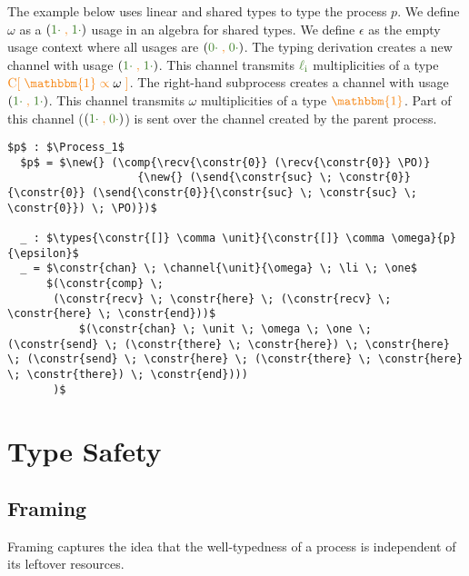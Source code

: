 \documentclass[a4paper,UKenglish,cleveref,autoref,thm-restate,authorcolumns]{lipics-v2019}
\theoremstyle{definition}
\newcommand{\type}[1]{\textcolor{BlueViolet}{\operatorname{#1}}}
\newcommand{\constr}[1]{\textcolor{BurntOrange}{\operatorname{#1}}}
\newcommand{\func}[1]{\textcolor{OliveGreen}{\operatorname{#1}}}
\newcommand{\PO}{\constr{\mathbb{0}}}
\newcommand{\comp}[2]{#1 \; \constr{\parallel} \; #2}
\newcommand{\new}{\constr{\boldsymbol{\nu}} \;}
\newcommand{\send}[2]{#1 \; \constr{\langle} \; #2 \;\constr{\rangle} \;}
\newcommand{\recv}[1]{#1 \; \constr{\mathbb{()}} \;}
\newcommand{\unit}{\constr{\mathbbm{1}}}
\newcommand{\channel}[2]{\constr{C[} \; #1 \; \constr{\propto} \; #2 \; \constr{]}}
\newcommand{\comma}{\; \constr{,} \;}
\newcommand{\zero}{\func{0\cdot}}
\newcommand{\one}{\func{1\cdot}}
\newcommand{\li}{\func{\ell_i}}
\newcommand{\types}[4]{#1 \; \type{\propto} \; #2 \; \type{\vdash} \; #3 \; \type{\boxtimes} \; #4}
\newcommand{\Process}{\type{PROCESS}}
\begin{document}
\begin{example}
  \label{example-derivations}
  The example below uses linear and shared types to type the process $p$. 
  We define $\omega$ as a $(\one \comma \one)$ usage in an algebra for shared types.
  We define $\epsilon$ as the empty usage context where all usages are $(\zero \comma \zero)$.
  The typing derivation creates a new channel with usage $(\one \comma \one)$.
  This channel transmits $\li$ multiplicities of a type $\channel{\unit}{\omega}$.
  The right-hand subprocess creates a channel with usage $(\one \comma \one)$.
  This channel transmits $\omega$ multiplicities of a type $\unit$.
  Part of this channel ($(\one \comma \zero)$) is sent over the channel created by the parent process.
  
  \begin{lstlisting}[mathescape]
  $p$ : $\Process_1$
  $p$ = $\new{} (\comp{\recv{\constr{0}} (\recv{\constr{0}} \PO)}
                    {\new{} (\send{\constr{suc} \; \constr{0}} {\constr{0}} (\send{\constr{0}}{\constr{suc} \; \constr{suc} \; \constr{0}}) \; \PO)})$

  _ : $\types{\constr{[]} \comma \unit}{\constr{[]} \comma \omega}{p}{\epsilon}$
  _ = $\constr{chan} \; \channel{\unit}{\omega} \; \li \; \one$
      $(\constr{comp} \;
       (\constr{recv} \; \constr{here} \; (\constr{recv} \; \constr{here} \; \constr{end}))$
           $(\constr{chan} \; \unit \; \omega \; \one \; (\constr{send} \; (\constr{there} \; \constr{here}) \; \constr{here} \; (\constr{send} \; \constr{here} \; (\constr{there} \; \constr{here} \; \constr{there}) \; \constr{end})))
       )$
  \end{lstlisting}
\end{example}


\section{Type Safety}
\label{type-safety}


\subsection{Framing}
\label{framing}

Framing captures the idea that the well-typedness of a process is independent of its leftover resources.
\end{document}
